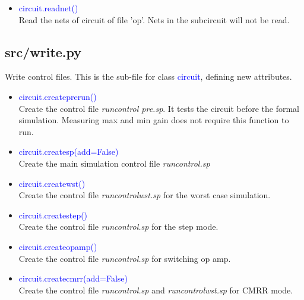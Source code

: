 \documentclass[12pt,a4paper]{article}
\begin{document}
\begin{itemize}[leftmargin=*]
\begin{itemize}
            \item \textcolor{blue}{circuit.readnet()}\\
                Read the nets of circuit of file 'op'. Nets in the subcircuit will not be read.
\end{itemize}

\subsection{src/\textunderscore write.py}
Write control files. This is the sub-file for class \textcolor{blue}{circuit}, defining new attributes.

\begin{itemize}[leftmargin=*]
    \item \textcolor{blue}{circuit.create\textunderscore prerun()}\\
        Create the control file \textit{run\textunderscore control \textunderscore pre.sp}. It tests the circuit before the formal simulation. Measuring max and min gain does not require this function to run.

    \item \textcolor{blue}{circuit.create\textunderscore sp(add=False)}\\
        Create the main simulation control file \textit{run\textunderscore control.sp}

    \item \textcolor{blue}{circuit.create\textunderscore wst()}\\
        Create the control file \textit{run\textunderscore control\textunderscore wst.sp} for the worst case simulation.

    \item \textcolor{blue}{circuit.create\textunderscore step()}\\
        Create the control file \textit{run\textunderscore control.sp} for the step mode.

    \item \textcolor{blue}{circuit.create\textunderscore opamp()}\\
        Create the control file \textit{run\textunderscore control.sp} for switching op amp.

    \item \textcolor{blue}{circuit.create\textunderscore cmrr(add=False)}\\
        Create the control file \textit{run\textunderscore control.sp} and \textit{run\textunderscore control\textunderscore wst.sp} for CMRR mode.


\end{itemize}
\end{itemize}
\end{document}
